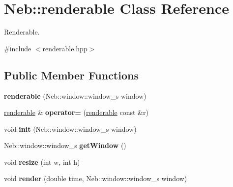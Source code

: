 \hypertarget{classNeb_1_1renderable}{\section{\-Neb\-:\-:renderable \-Class \-Reference}
\label{classNeb_1_1renderable}
}


\-Renderable.  




{\ttfamily \#include $<$renderable.\-hpp$>$}

\subsection*{\-Public \-Member \-Functions}
\begin{DoxyCompactItemize}
\item 
\hypertarget{classNeb_1_1renderable_af3b47768c919df0faf660899c33dd6e8}{{\bfseries renderable} (\-Neb\-::window\-::window\-\_\-s window)}\label{classNeb_1_1renderable_af3b47768c919df0faf660899c33dd6e8}

\item 
\hypertarget{classNeb_1_1renderable_a7c18c1b5d009a3fb73f86e335ffcc556}{\hyperlink{classNeb_1_1renderable}{renderable} \& {\bfseries operator=} (\hyperlink{classNeb_1_1renderable}{renderable} const \&r)}\label{classNeb_1_1renderable_a7c18c1b5d009a3fb73f86e335ffcc556}

\item 
\hypertarget{classNeb_1_1renderable_a7ff2af24b83fef9b240858976257ab3d}{void {\bfseries init} (\-Neb\-::window\-::window\-\_\-s window)}\label{classNeb_1_1renderable_a7ff2af24b83fef9b240858976257ab3d}

\item 
\hypertarget{classNeb_1_1renderable_a33656881f53f9be7bab71ea5cc316ef1}{\-Neb\-::window\-::window\-\_\-s {\bfseries get\-Window} ()}\label{classNeb_1_1renderable_a33656881f53f9be7bab71ea5cc316ef1}

\item 
\hypertarget{classNeb_1_1renderable_abd73b2bba233d1ff95fe46496888a5cf}{void {\bfseries resize} (int w, int h)}\label{classNeb_1_1renderable_abd73b2bba233d1ff95fe46496888a5cf}

\item 
\hypertarget{classNeb_1_1renderable_ab9c70cca0380015ecfde70d9a106c31c}{void {\bfseries render} (double time, \-Neb\-::window\-::window\-\_\-s window)}\label{classNeb_1_1renderable_ab9c70cca0380015ecfde70d9a106c31c}


\end{DoxyCompactItemize}
